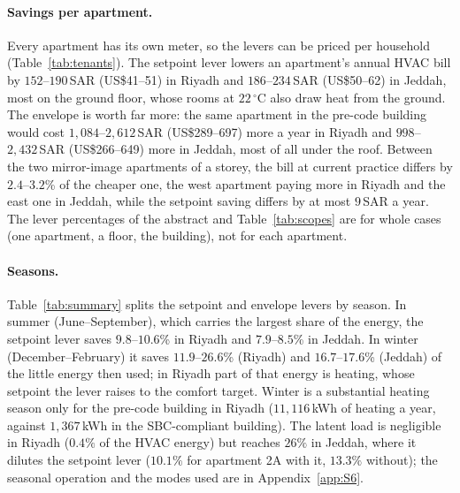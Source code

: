 \documentclass[10pt,a4paper,twocolumn]{article}
\theoremstyle{definition}
\begin{document}
\paragraph{Savings per apartment.}\label{sec:perapt} Every apartment has its own meter, so the levers can be priced per household (Table~\ref{tab:tenants}). The setpoint lever lowers an apartment's annual HVAC bill by $152$--$190\,$SAR (US\$41--51) in Riyadh and $186$--$234\,$SAR (US\$50--62) in Jeddah, most on the ground floor, whose rooms at $22\,^{\circ}$C also draw heat from the ground. The envelope is worth far more: the same apartment in the pre-code building would cost $1{,}084$--$2{,}612\,$SAR (US\$289--697) more a year in Riyadh and $998$--$2{,}432\,$SAR (US\$266--649) more in Jeddah, most of all under the roof. Between the two mirror-image apartments of a storey, the bill at current practice differs by $2.4$--$3.2$\% of the cheaper one, the west apartment paying more in Riyadh and the east one in Jeddah, while the setpoint saving differs by at most $9\,$SAR a year. The lever percentages of the abstract and Table~\ref{tab:scopes} are for whole cases (one apartment, a floor, the building), not for each apartment.

\paragraph{Seasons.}\label{sec:reslatent} Table~\ref{tab:summary} splits the setpoint and envelope levers by season. In summer (June--September), which carries the largest share of the energy, the setpoint lever saves $9.8$--$10.6$\% in Riyadh and $7.9$--$8.5$\% in Jeddah. In winter (December--February) it saves $11.9$--$26.6$\% (Riyadh) and $16.7$--$17.6$\% (Jeddah) of the little energy then used; in Riyadh part of that energy is heating, whose setpoint the lever raises to the comfort target. Winter is a substantial heating season only for the pre-code building in Riyadh ($11{,}116\,$kWh of heating a year, against $1{,}367\,$kWh in the SBC-compliant building). The latent load is negligible in Riyadh ($0.4\%$ of the HVAC energy) but reaches $26\%$ in Jeddah, where it dilutes the setpoint lever ($10.1\%$ for apartment 2A with it, $13.3\%$ without); the seasonal operation and the modes used are in Appendix~\ref{app:S6}.
\end{document}
